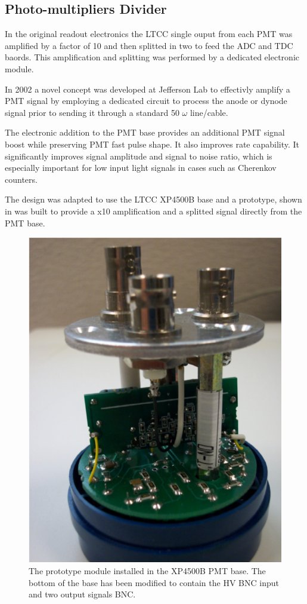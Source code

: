 \subsection{Photo-multipliers Divider}

In the original readout electronics the LTCC single ouput from each PMT was amplified by a factor of 10
and then splitted in two to feed the ADC and TDC baords. This amplification and splitting was performed
by a dedicated electronic module. 

In 2002 a novel concept \cite{Popov:2003mj} was developed at Jefferson Lab to effectivly amplify a PMT signal by employing a dedicated circuit
to process the anode or dynode signal prior to sending it through a standard 50 $\omega$ line/cable.

The electronic addition to the PMT base provides an additional PMT signal boost while preserving
PMT fast pulse shape. It also improves rate capability. It significantly improves signal amplitude and
signal to noise ratio, which is especially important for low input light signals in cases such as Cherenkov counters.

The design was adapted to use the LTCC XP4500B base and a prototype, shown in  was built to provide a x10
amplification and a splitted signal directly from the PMT base.


\begin{figure}
	\centering
	\includegraphics[width=0.95\columnwidth,keepaspectratio]{img/pmtWithDivider.png}
	\caption{The prototype module installed in the XP4500B PMT base. The bottom of the base has been modified to contain the HV
				BNC input and two output signals BNC. }
	\label{fig:pmtWithDivider}
\end{figure}

